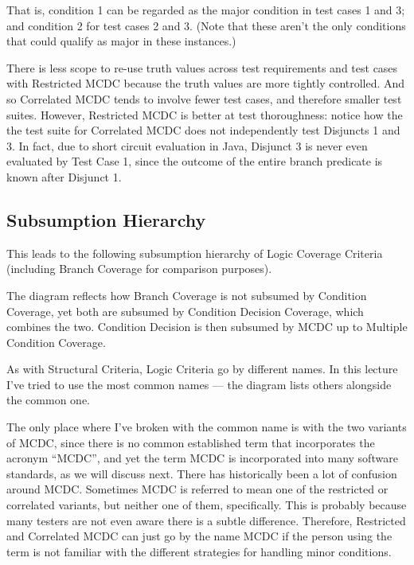 
That is, condition 1 can be regarded as the major condition in test cases 1 and
3; and condition 2 for test cases 2 and 3. (Note that these aren't the only
conditions that could qualify as major in these instances.)

There is less scope to re-use truth values across test requirements and test
cases with Restricted MCDC because the truth values are more tightly controlled.
And so Correlated MCDC tends to involve fewer test cases, and therefore smaller test
suites. However, Restricted MCDC is better at test thoroughness: notice how the
the test suite for Correlated MCDC does not independently test Disjuncts 1 and
3. In fact, due to short circuit evaluation in Java, Disjunct 3 is never even
evaluated by Test Case 1, since the outcome of the entire branch predicate is
known after Disjunct 1.


\subsection{Subsumption Hierarchy}

This leads to the following subsumption hierarchy of Logic Coverage Criteria
(including Branch Coverage for comparison purposes).


The diagram reflects how Branch Coverage is not subsumed by Condition Coverage,
yet both are subsumed by Condition Decision Coverage, which combines the two.
Condition Decision is then subsumed by MCDC up to Multiple Condition Coverage.

As with Structural Criteria, Logic Criteria go by different names. In this
lecture I've tried to use the most common names --- the diagram lists others
alongside the common one. 

The only place where I've broken with the common name is with the two variants
of MCDC, since there is no common established term that incorporates the acronym
``MCDC'', and yet the term MCDC is incorporated into many software standards, as
we will discuss next.
%
There has historically been a lot of confusion around MCDC. Sometimes MCDC is
referred to mean one of the restricted or correlated variants, but neither one of
them, specifically. This is probably because many testers are not even aware
there is a subtle difference. 
%
Therefore, Restricted and Correlated MCDC can just go by the name MCDC if the
person using the term is not familiar with the different strategies for handling
minor conditions. 

